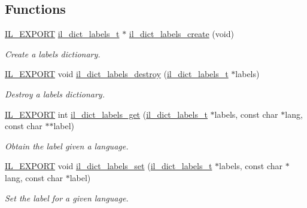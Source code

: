 \subsection*{Functions}
\begin{DoxyCompactItemize}
\item 
\hyperlink{common_8h_a6bb629d26c52bfe10519ba3176853f47}{I\+L\+\_\+\+E\+X\+P\+O\+RT} \hyperlink{group__IL__DICT__LABELS_ga69d1109256f465cbcfa8aac7fa592495}{il\+\_\+dict\+\_\+labels\+\_\+t} $\ast$ \hyperlink{group__IL__DICT__LABELS_ga3d1801f1328932552ae98c151079514b}{il\+\_\+dict\+\_\+labels\+\_\+create} (void)
\begin{DoxyCompactList}\small\item\em Create a labels dictionary. \end{DoxyCompactList}\item 
\hyperlink{common_8h_a6bb629d26c52bfe10519ba3176853f47}{I\+L\+\_\+\+E\+X\+P\+O\+RT} void \hyperlink{group__IL__DICT__LABELS_ga5dbfa1bafc6fd6e5c1e3356579e6b03a}{il\+\_\+dict\+\_\+labels\+\_\+destroy} (\hyperlink{group__IL__DICT__LABELS_ga69d1109256f465cbcfa8aac7fa592495}{il\+\_\+dict\+\_\+labels\+\_\+t} $\ast$labels)
\begin{DoxyCompactList}\small\item\em Destroy a labels dictionary. \end{DoxyCompactList}\item 
\hyperlink{common_8h_a6bb629d26c52bfe10519ba3176853f47}{I\+L\+\_\+\+E\+X\+P\+O\+RT} int \hyperlink{group__IL__DICT__LABELS_ga40033ee8b33c612a90feec8ecfeaec40}{il\+\_\+dict\+\_\+labels\+\_\+get} (\hyperlink{group__IL__DICT__LABELS_ga69d1109256f465cbcfa8aac7fa592495}{il\+\_\+dict\+\_\+labels\+\_\+t} $\ast$labels, const char $\ast$lang, const char $\ast$$\ast$label)
\begin{DoxyCompactList}\small\item\em Obtain the label given a language. \end{DoxyCompactList}\item 
\hyperlink{common_8h_a6bb629d26c52bfe10519ba3176853f47}{I\+L\+\_\+\+E\+X\+P\+O\+RT} void \hyperlink{group__IL__DICT__LABELS_ga31c468b558ffe84fbd413883ce80eb84}{il\+\_\+dict\+\_\+labels\+\_\+set} (\hyperlink{group__IL__DICT__LABELS_ga69d1109256f465cbcfa8aac7fa592495}{il\+\_\+dict\+\_\+labels\+\_\+t} $\ast$labels, const char $\ast$lang, const char $\ast$label)
\begin{DoxyCompactList}\small\item\em Set the label for a given language. \end{DoxyCompactList}\item 
$$
\end{DoxyCompactItemize}
